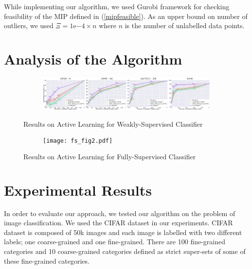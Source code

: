 \documentclass{article}
\begin{document}
While implementing our algorithm, we used Gurobi \cite{gurobi} framework for checking feasibility of the MIP defined in (\ref{mipfeasible}). As an upper bound on number of outliers, we used $\Xi=1\mathrm{e}{-4} \times n$ where $n$ is the number of unlabelled data points.

\section{Analysis of the Algorithm}
\label{sec:analysis}


\begin{figure}[ht]
    \centering
    \begin{subfigure}[b]{\textwidth}
        \includegraphics[width=\textwidth]{ws_fig2.pdf}
    \end{subfigure}
    \vspace{-5mm}
    \caption{Results on Active Learning for Weakly-Supervised Classifier}\label{fig:resnosemi}
        \vspace{-3mm}
    \label{fig:resns}
   \vspace{5mm}
    \begin{subfigure}[b]{\textwidth}
        \texttt{[image: fs\_fig2.pdf]}
    \end{subfigure}
        \vspace{-5mm}
    \caption{Results on Active Learning for Fully-Supervised Classifier}\label{fig:ressemi}
        \vspace{-5mm}
    \label{fig:ress}
\end{figure}

\section{Experimental Results}
\label{sec:exp}

In order to evaluate our approach, we tested our algorithm on the problem of image classification. We used the CIFAR\cite{cifar} dataset in our experiments.  CIFAR\cite{cifar} dataset is composed of 50k images and each image is labelled with two different labels; one coarse-grained and one fine-grained. There are 100 fine-grained categories and 10 coarse-grained categories defined as strict super-sets of some of these fine-grained categories. 
\end{document}
